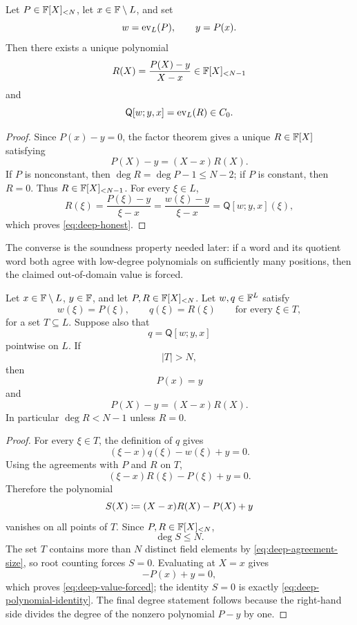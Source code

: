 \begin{lemma}
\label{lem:deep-honest}
Let $P\in\mathbb{F}[X]_{<N}$, let $x\in\mathbb{F}\setminus L$, and set
\[
  w=\operatorname{ev}_L(P),\qquad y=P(x).
\]
Then there exists a unique polynomial
\[
  R(X)=\frac{P(X)-y}{X-x}\in\mathbb{F}[X]_{<N-1}
\]
and
\begin{equation}
  \mathsf Q[w;y,x]=\operatorname{ev}_L(R)\in C_0.
  \label{eq:deep-honest}
\end{equation}
\end{lemma}

\begin{proof}
Since $P(x)-y=0$, the factor theorem gives a unique $R\in\mathbb{F}[X]$ satisfying
\[
  P(X)-y=(X-x)R(X).
\]
If $P$ is nonconstant, then $\deg R=\deg P-1\le N-2$; if $P$ is constant, then $R=0$.  Thus $R\in\mathbb{F}[X]_{<N-1}$.  For every $\xi\in L$,
\[
  R(\xi)=\frac{P(\xi)-y}{\xi-x}
  =\frac{w(\xi)-y}{\xi-x}
  =\mathsf Q[w;y,x](\xi),
\]
which proves \eqref{eq:deep-honest}.
\end{proof}

The converse is the soundness property needed later: if a word and its quotient word both agree with low-degree polynomials on sufficiently many positions, then the claimed out-of-domain value is forced.

\begin{lemma}
\label{lem:deep-consistency}
Let $x\in\mathbb{F}\setminus L$, $y\in\mathbb{F}$, and let $P,R\in\mathbb{F}[X]_{<N}$.  Let $w,q\in\mathbb{F}^L$ satisfy
\[
  w(\xi)=P(\xi),
  \qquad
  q(\xi)=R(\xi)
  \qquad
  \text{for every }\xi\in T,
\]
for a set $T\subseteq L$.  Suppose also that
\[
  q=\mathsf Q[w;y,x]
\]
pointwise on $L$.  If
\begin{equation}
  |T|>N,
  \label{eq:deep-agreement-size}
\end{equation}
then
\begin{equation}
  P(x)=y
  \label{eq:deep-value-forced}
\end{equation}
and
\begin{equation}
  P(X)-y=(X-x)R(X).
  \label{eq:deep-polynomial-identity}
\end{equation}
In particular $\deg R<N-1$ unless $R=0$.
\end{lemma}

\begin{proof}
For every $\xi\in T$, the definition of $q$ gives
\[
  (\xi-x)q(\xi)-w(\xi)+y=0.
\]
Using the agreements with $P$ and $R$ on $T$,
\[
  (\xi-x)R(\xi)-P(\xi)+y=0.
\]
Therefore the polynomial
\[
  S(X)\coloneqq (X-x)R(X)-P(X)+y
\]
vanishes on all points of $T$.  Since $P,R\in\mathbb{F}[X]_{<N}$,
\[
  \deg S\le N.
\]
The set $T$ contains more than $N$ distinct field elements by \eqref{eq:deep-agreement-size}, so root counting forces $S=0$.  Evaluating at $X=x$ gives
\[
  -P(x)+y=0,
\]
which proves \eqref{eq:deep-value-forced}; the identity $S=0$ is exactly \eqref{eq:deep-polynomial-identity}.  The final degree statement follows because the right-hand side divides the degree of the nonzero polynomial $P-y$ by one.
\end{proof}

